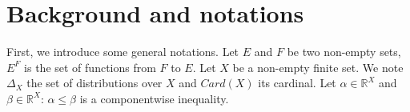 \documentclass[11pt]{article}
\begin{document}
\section{Background and notations}
\label{sec:background}
First, we introduce some general notations.
Let $E$ and $F$ be two non-empty sets, $E^F$ is the set of functions from $F$ to $E$.
Let $X$ be a non-empty finite set. We note $\Delta_X$ the set of distributions over $X$ and $Card(X)$ its cardinal. 
Let $\alpha\in\mathbb{R}^X$ and $\beta\in\mathbb{R}^X$: $\alpha\leq\beta$ is a componentwise inequality.
\end{document}
